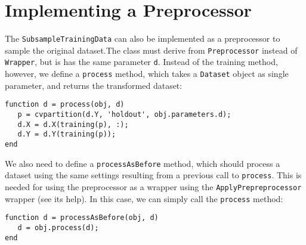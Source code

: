 \section{Implementing a Preprocessor}

The \verb|SubsampleTrainingData| can also be implemented as a preprocessor to sample the original dataset.The class must derive from \verb|Preprocessor| instead of \verb|Wrapper|, but is has the same parameter \verb|d|. Instead of the training method, however, we define a \verb|process| method, which takes a \verb|Dataset| object as single parameter, and returns the transformed dataset:

\begin{lstlisting}
function d = process(obj, d)
   p = cvpartition(d.Y, 'holdout', obj.parameters.d);
   d.X = d.X(training(p), :);
   d.Y = d.Y(training(p));
end
\end{lstlisting}

\noindent We also need to define a \verb|processAsBefore| method, which should process a dataset using the same settings resulting from a previous call to \verb|process|. This is needed for using the preprocessor as a wrapper using the \verb|ApplyPrepreprocessor| wrapper (see its help). In this case, we can simply call the \verb|process| method:

\begin{lstlisting}
function d = processAsBefore(obj, d)
   d = obj.process(d);
end
\end{lstlisting}